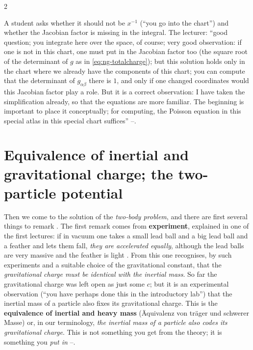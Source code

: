 \begin{paracol}{2}
\begin{coursenote}
A student asks whether it should not be $x^{-1}$ (``you go into the chart'') and whether the Jacobian factor is missing in the integral. The lecturer: ``good question; you integrate here over the space, of course; very good observation: if one is not in this chart, one must put in the Jacobian factor too (the square root of the determinant of $g$ as in \eqref{eq:ng-totalcharge}); but this solution holds only in the chart where we already have the components of this chart; you can compute that the determinant of $g_{\alpha\beta}$ there is $1$, and only if
one changed coordinates would this Jacobian factor play a role. But it is a correct observation: I have taken the simplification already, so that the equations are more familiar. The beginning is important to place it conceptually; for computing, the Poisson equation in this special atlas in this special chart suffices'' --.
\end{coursenote}

\section{Equivalence of inertial and gravitational charge; the two-particle potential}\label{sec:ng-two}

Then we come to the solution of the \emph{two-body problem}, and there are first several things to remark . The first remark comes from \textbf{experiment}, explained in one of the first lectures: if in vacuum one takes a small lead ball and a big lead ball and a feather and lets them fall, \emph{they are accelerated equally}, although the lead balls are very massive
and the feather is light . From this one recognises, by such experiments and a suitable choice of the gravitational constant, that the \emph{gravitational charge must be identical with the inertial mass}. So far the gravitational charge was left open as just some $c$; but it is an experimental observation (``you have perhaps done this in the introductory lab'') that the inertial mass of a particle also fixes its gravitational charge.
This is the \textbf{equivalence of inertial and heavy mass} (Äquivalenz von tr\"ager und schwerer Masse) or, in our terminology, \emph{the inertial mass of a particle also codes its gravitational charge}. This is not something you get from the theory; it is something you \emph{put in} --.


\end{paracol}
